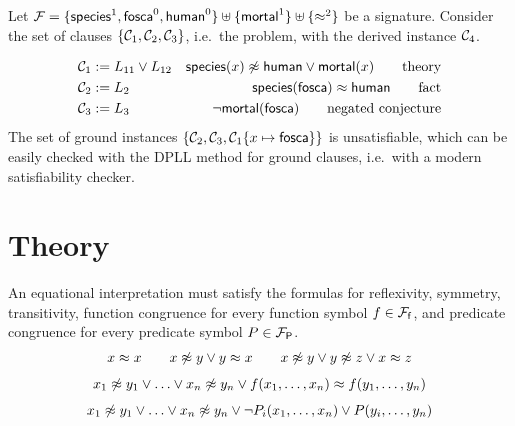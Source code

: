 \begin{example} Let ${\mathcal F} = \{\mathsf{species}^1, \mathsf{fosca}^0, \mathsf{human}^0 \} \uplus \{ \mathsf{mortal}^1  \} \uplus \{\approx^2\}$ be a signature. 
	Consider the set of clauses $\{ {\mathcal C}_1, {\mathcal C}_2, {\mathcal C}_3 \}$, i.e.~{\myem the problem}, with the derived instance ${\mathcal C}_4$.


\begin{align*}
{\mathcal C}_1 &:= L_{11}\lor L_{12}&\mathsf{species}(x)\not\approx\mathsf{human}\lor\mathsf{mortal}(x) \tag*{theory}\\
{\mathcal C}_2 &:= L_2&\mathsf{species}(\mathsf{fosca})\approx\mathsf{human} \tag*{fact} \\
{\mathcal C}_3 &:=L_3&\lnot\mathsf{mortal}(\mathsf{fosca}) \tag*{negated conjecture} \\
\end{align*}
The set of ground instances $\{ {\mathcal C}_2, {\mathcal C}_3,{\mathcal C}_1 \{x\mapsto\mathsf{fosca}\}  \}$ is unsatisfiable,
which can be easily checked with the DPLL \cite{Davis:1962:MPT:368273.368557, Davis:1960:CPQ:321033.321034} 
method for ground clauses, i.e.~with a modern satisfiability checker.

\section{Theory}



	An equational interpretation must satisfy the formulas for reflexivity, symmetry, transitivity, 
	function congruence for every function symbol $f\in{{\mathcal F}_{\mathsf f}}$, 
	and predicate congruence for every predicate symbol $P\in{{\mathcal F}_{\mathsf P}}$.
	\[
		\begin{array}[t]{c}
		x\mEQ x 
\qquad
		x\mNE y\lor y\mEQ x
\qquad		
		x\mNE y\lor y\mNE z\lor x\mEQ z \\[0.7em]
%		
x_1 \mNE y_1\lor\ldots\lor x_n \mNE y_n\lor f(x_1,\ldots,x_n)\mEQ f(y_1,\ldots,y_n) \\[0.7em]
%
x_1\mNE y_1\lor\ldots\lor x_n\mNE y_n\lor\lnot P_i(x_1,\ldots,x_n)\lor P(y_i,\ldots,y_n)

		\end{array}
	\]







\end{example}

